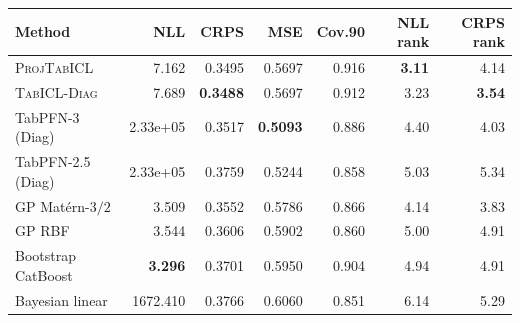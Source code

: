 \begin{tabular}{lrrrrrr}
\toprule Method & NLL & CRPS & MSE & Cov.90 & NLL rank & CRPS rank \\
\midrule
\textsc{ProjTabICL} & 7.162 & 0.3495 & 0.5697 & 0.916 & \textbf{3.11} & 4.14 \\
\textsc{TabICL-Diag} & 7.689 & \textbf{0.3488} & 0.5697 & 0.912 & 3.23 & \textbf{3.54} \\
TabPFN-3 (Diag) & 2.33e+05 & 0.3517 & \textbf{0.5093} & 0.886 & 4.40 & 4.03 \\
TabPFN-2.5 (Diag) & 2.33e+05 & 0.3759 & 0.5244 & 0.858 & 5.03 & 5.34 \\
GP Mat\'ern-$3/2$ & 3.509 & 0.3552 & 0.5786 & 0.866 & 4.14 & 3.83 \\
GP RBF & 3.544 & 0.3606 & 0.5902 & 0.860 & 5.00 & 4.91 \\
Bootstrap CatBoost & \textbf{3.296} & 0.3701 & 0.5950 & 0.904 & 4.94 & 4.91 \\
Bayesian linear & 1672.410 & 0.3766 & 0.6060 & 0.851 & 6.14 & 5.29 \\
\bottomrule
\end{tabular}
